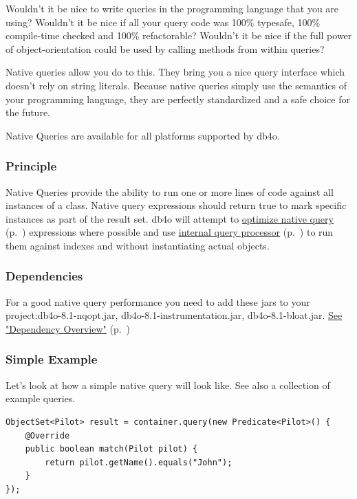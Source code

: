 Wouldn't it be nice to write queries in the programming language that you are using? Wouldn't it be nice if all your query code was 100\% typesafe, 100\% compile-time checked and 100\% refactorable? Wouldn't it be nice if the full power of object-orientation could be used by calling methods from within queries?

Native queries allow you do to this. They bring you a nice query interface which doesn't rely on string literals. Because native queries simply use the semantics of your programming language, they are perfectly standardized and a safe choice for the future.

Native Queries are available for all platforms supported by db4o.

\subsubsection*{Principle}

Native Queries provide the ability to run one or more lines of code against all instances of a class. Native query expressions should return true to mark specific instances as part of the result set. db4o will attempt to \hyperref[ref:basics-querying-native-queries-native-query-optimization]{optimize native query} (p.~\pageref{ref:basics-querying-native-queries-native-query-optimization}) expressions where possible and use \hyperref[ref:basics-querying-soda-query]{internal query processor} (p.~\pageref{ref:basics-querying-soda-query}) to run them against indexes and without instantiating actual objects.

\subsubsection*{Dependencies}

For a good native query performance you need to add these jars to your project:db4o-8.1-nqopt.jar, db4o-8.1-instrumentation.jar, db4o-8.1-bloat.jar. \hyperref[ref:dependency-overview]{See "Dependency Overview"} (p.~\pageref{ref:dependency-overview})

\subsubsection*{Simple Example}

Let's look at how a simple native query will look like. See also a collection of example queries.

\begin{lstlisting}
ObjectSet<Pilot> result = container.query(new Predicate<Pilot>() {
    @Override
    public boolean match(Pilot pilot) {
        return pilot.getName().equals("John");
    }
});
\end{lstlisting}

